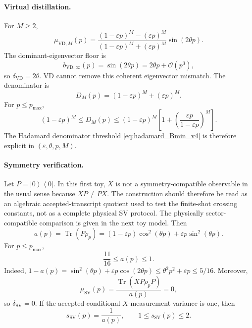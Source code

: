 \documentclass[11pt]{article}
\DeclareMathOperator{\Tr}{Tr}
\newcommand{\1}{\mathbf{1}}
\newcommand{\OO}{\mathcal{O}}
\newcommand{\bra}[1]{\left\langle #1\right|}
\newcommand{\ket}[1]{\left|#1\right\rangle}
\begin{document}
\paragraph{Virtual distillation.}
For \(M\geq2\),
\begin{equation}
    \mu_{\mathrm{VD},M}(p)=
    \frac{(1-\varepsilon p)^M-(\varepsilon p)^M}{(1-\varepsilon p)^M+(\varepsilon p)^M}\sin(2\theta p).
\end{equation}
The dominant-eigenvector floor is
\begin{equation}
    b_{\mathrm{VD},\infty}(p)=\sin(2\theta p)=2\theta p+\OO(p^3),
\end{equation}
so \(\delta_{\mathrm{VD}}=2\theta\).  VD cannot remove this coherent eigenvector mismatch.  The denominator is
\begin{equation}
    D_M(p)=(1-\varepsilon p)^M+(\varepsilon p)^M.
\end{equation}
For \(p\leq p_{\max}\),
\begin{equation}
    (1-\varepsilon p)^M\leq D_M(p)\leq (1-\varepsilon p)^M\left[1+\left(\frac{\varepsilon p}{1-\varepsilon p}\right)^M\right].
\end{equation}
The Hadamard denominator threshold \cref{eq:hadamard_Bmin_v4} is therefore explicit in \((\varepsilon,\theta,p,M)\).

\paragraph{Symmetry verification.}
Let \(P=\ket0\bra0\).  In this first toy, \(X\) is not a symmetry-compatible observable in the usual sense because \(XP\ne PX\).  The construction should therefore be read as an algebraic accepted-transcript quotient used to test the finite-shot crossing constants, not as a complete physical SV protocol.  The physically sector-compatible comparison is given in the next toy model.  Then
\begin{equation}
    a(p)=\Tr(P\rho_p)=
    (1-\varepsilon p)\cos^2(\theta p)+\varepsilon p\sin^2(\theta p).
\end{equation}
For \(p\leq p_{\max}\),
\begin{equation}
    \frac{11}{16}\leq a(p)\leq1.
    \label{eq:toy_acceptance_bounds_v4}
\end{equation}
Indeed, \(1-a(p)=\sin^2(\theta p)+\varepsilon p\cos(2\theta p)\le \theta^2p^2+\varepsilon p\le5/16\).
Moreover,
\begin{equation}
    \mu_{\mathrm{SV}}(p)=\frac{\Tr(XP\rho_pP)}{a(p)}=0,
\end{equation}
so \(\delta_{\mathrm{SV}}=0\).  If the accepted conditional \(X\)-measurement variance is one, then
\begin{equation}
    s_{\mathrm{SV}}(p)=\frac1{a(p)},
    \qquad
    1\leq s_{\mathrm{SV}}(p)\leq2.
    \label{eq:toy_sv_variance_bounds_v4}
\end{equation}
\end{document}
